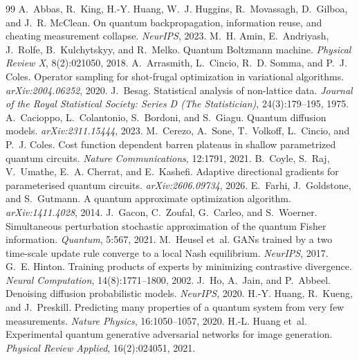 \documentclass[11pt]{article}
\begin{document}
\begin{thebibliography}{99}
\small
\setlength{\itemsep}{2pt}
 A.~Abbas, R.~King, H.-Y. Huang, W.~J. Huggins, R.~Movassagh, D.~Gilboa, and J.~R. McClean. On quantum backpropagation, information reuse, and cheating measurement collapse. {\em NeurIPS}, 2023.
 M.~H. Amin, E.~Andriyash, J.~Rolfe, B.~Kulchytskyy, and R.~Melko. Quantum Boltzmann machine. {\em Physical Review X}, 8(2):021050, 2018.
 A.~Arrasmith, L.~Cincio, R.~D. Somma, and P.~J. Coles. Operator sampling for shot-frugal optimization in variational algorithms. {\em arXiv:2004.06252}, 2020.
 J.~Besag. Statistical analysis of non-lattice data. {\em Journal of the Royal Statistical Society: Series D (The Statistician)}, 24(3):179--195, 1975.
 A.~Cacioppo, L.~Colantonio, S.~Bordoni, and S.~Giagu. Quantum diffusion models. {\em arXiv:2311.15444}, 2023.
 M.~Cerezo, A.~Sone, T.~Volkoff, L.~Cincio, and P.~J. Coles. Cost function dependent barren plateaus in shallow parametrized quantum circuits. {\em Nature Communications}, 12:1791, 2021.
 B.~Coyle, S.~Raj, V.~Umathe, E.~A. Cherrat, and E.~Kashefi. Adaptive directional gradients for parameterised quantum circuits. {\em arXiv:2606.09734}, 2026.
 E.~Farhi, J.~Goldstone, and S.~Gutmann. A quantum approximate optimization algorithm. {\em arXiv:1411.4028}, 2014.
 J.~Gacon, C.~Zoufal, G.~Carleo, and S.~Woerner. Simultaneous perturbation stochastic approximation of the quantum Fisher information. {\em Quantum}, 5:567, 2021.
 M.~Heusel et~al. GANs trained by a two time-scale update rule converge to a local Nash equilibrium. {\em NeurIPS}, 2017.
 G.~E. Hinton. Training products of experts by minimizing contrastive divergence. {\em Neural Computation}, 14(8):1771--1800, 2002.
 J.~Ho, A.~Jain, and P.~Abbeel. Denoising diffusion probabilistic models. {\em NeurIPS}, 2020.
 H.-Y. Huang, R.~Kueng, and J.~Preskill. Predicting many properties of a quantum system from very few measurements. {\em Nature Physics}, 16:1050--1057, 2020.
 H.-L. Huang et~al. Experimental quantum generative adversarial networks for image generation. {\em Physical Review Applied}, 16(2):024051, 2021.

\end{thebibliography}
\end{document}

